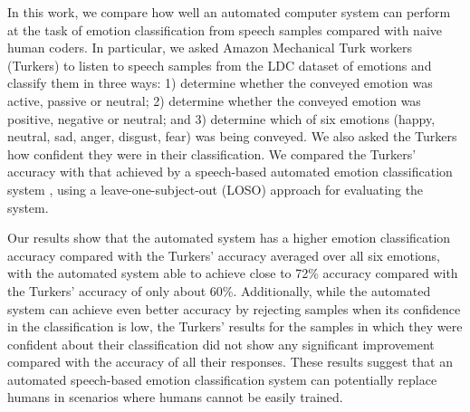 \documentclass{article}
\begin{document}
In this work, we compare how well an automated computer system can perform at the task of emotion classification from speech samples compared with naive human coders.  In particular, we asked Amazon Mechanical Turk workers (Turkers) to listen to speech samples from the LDC dataset of emotions \cite{LDC} and classify them in three ways: 1) determine whether the conveyed emotion was active, passive or neutral; 2) determine whether the conveyed emotion was positive, negative or neutral; and 3) determine which of six emotions (happy, neutral, sad, anger, disgust, fear) was being conveyed.  We also asked the Turkers how confident they were in their classification.  We compared the Turkers' accuracy with that achieved by a speech-based automated emotion classification system \cite{yang2012speech}, using a leave-one-subject-out (LOSO) approach for evaluating the system. \par
Our results show that the automated system has a higher emotion classification accuracy compared with the Turkers' accuracy averaged over all six emotions, with the automated system able to achieve close to 72\% accuracy compared with the Turkers' accuracy of only about 60\%.  Additionally, while the automated system can achieve even better accuracy by rejecting samples when its confidence in the classification is low, the Turkers' results for the samples in which they were confident about their classification did not show any significant improvement compared with the accuracy of all their responses. These results suggest that an automated speech-based emotion classification system can potentially replace humans in scenarios where humans cannot be easily trained.
\end{document}
